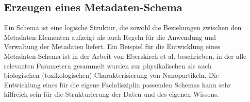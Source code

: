 \subsection{Erzeugen eines Metadaten-Schema}
Ein Schema ist eine logische Struktur, die sowohl die Beziehungen zwischen den Metadaten-Elementen aufzeigt als auch Regeln für die Anwendung und Verwaltung der Metadaten liefert. Ein Beispiel für die Entwicklung eines Metadaten-Schema ist in der Arbeit von Eberskirch et al. \cite{elberskirch:2022} beschrieben, in der alle relevanten Parametern gesammelt wurden zur physikalischen als auch biologischen (toxikologischen) Charakterisierung von Nanopartikeln.
Die Entwicklung eines für die eigene Fachdisziplin passenden Schemas kann sehr hilfreich sein für die Strukturierung der Daten und des eigenen Wissens.






